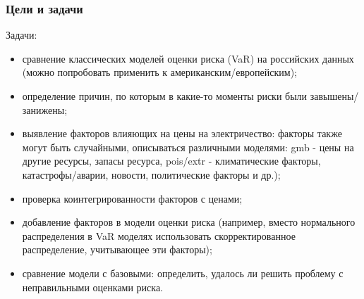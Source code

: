 \documentclass[c, dvipsnames]{beamer}  %
\begin{document}
\begin{frame}[shrink=3]
\frametitle{Цели и задачи} 


\begin{block}{Задачи:}


	\begin{itemize}
		
		\item  сравнение классических моделей оценки риска (VaR) на российских данных (можно попробовать применить к американским/европейским);
		
		\item определение причин, по которым в какие-то моменты риски были завышены/занижены;  

				
		\item  выявление факторов влияющих на цены на электричество: факторы также могут быть случайными,  описываться различными моделями: gmb - цены на другие ресурсы, запасы ресурса, pois/extr - климатические факторы, катастрофы/аварии, новости, политические факторы и др.); 
		  
		

		\item  проверка коинтегрированности факторов с ценами;

		\item  добавление факторов в модели оценки риска (например, вместо нормального распределения в VaR моделях использовать скорректированное распределение, учитывающее эти факторы);
		\item  сравнение модели с базовыми: определить, удалось ли решить проблему с неправильными оценками риска. 		
		
		
	\end{itemize}
	
\end{block}
\end{frame}
\end{document}
